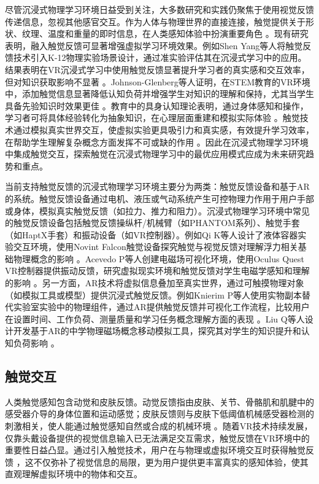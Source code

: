 \documentclass[runningheads]{llncs}
\begin{document}
尽管沉浸式物理学习环境日益受到关注，大多数研究和实践仍聚焦于使用视觉反馈传递信息，忽视其他感官交互。作为人体与物理世界的直接连接，触觉提供关于形状、纹理、温度和重量的即时信息，在人类感知体验中扮演重要角色 \cite{zhang2023active}。现有研究表明，融入触觉反馈可显著增强虚拟学习环境效果。例如Shen Yang等人将触觉反馈技术引入K-12物理实验场景设计，通过准实验评估其在沉浸式学习中的应用。结果表明在VR沉浸式学习中使用触觉反馈显著提升学习者的真实感和交互效率，但对知识获取影响不显著 \cite{shen2023research}。Johnson-Glenberg等人证明，在STEM教育的VR环境中，添加触觉信息显著降低认知负荷并增强学生对知识的理解和保持，尤其当学生具备先验知识时效果更佳 \cite{johnson2023embodied}。教育中的具身认知理论表明，通过身体感知和操作，学习者可将具体经验转化为抽象知识，在心理层面重建和模拟实际体验 \cite{varela2017embodied}。触觉技术通过模拟真实世界交互，使虚拟实验更具吸引力和真实感，有效提升学习效率，在帮助学生理解复杂概念方面发挥不可或缺的作用 \cite{shapiro2019embodied}。因此在沉浸式物理学习环境中集成触觉交互，探索触觉在沉浸式物理学习中的最优应用模式应成为未来研究趋势和重点。

当前支持触觉反馈的沉浸式物理学习环境主要分为两类：触觉反馈设备和基于AR的系统。触觉反馈设备通过电机、液压或气动系统产生可控物理力作用于用户手部或身体，模拟真实触觉反馈（如拉力、推力和阻力）。沉浸式物理学习环境中常见的触觉反馈设备包括触觉反馈操纵杆/机械臂（如PHANTOM系列）、触觉手套（如HaptX手套）和振动设备（如VR控制器）。例如Qi K等人设计了液体容器实验交互环境，使用Novint Falcon触觉设备探究触觉与视觉反馈对理解浮力相关基础物理概念的影响 \cite{qi2020impact}。Acevedo P等人创建电磁场可视化环境，使用Oculus Quest VR控制器提供振动反馈，研究虚拟现实环境和触觉反馈对学生电磁学感知和理解的影响 \cite{acevedo2022effects}。另一方面，AR技术将虚拟信息叠加至真实世界，通过可触摸物理对象（如模拟工具或模型）提供沉浸式触觉反馈。例如Knierim P等人使用实物副本替代实验室实验中的物理组件，通过AR提供触觉反馈并可视化工作流程，比较用户在设置时间、工作负荷、测量质量和学习任务概念理解方面的表现 \cite{knierim2020tangibility}。Liu Q等人设计开发基于AR的中学物理磁场概念移动模拟工具，探究其对学生的知识提升和认知负荷影响 \cite{liu2021effects}。

\subsection{触觉交互}
人类触觉感知包含动觉和皮肤反馈。动觉反馈指由皮肤、关节、骨骼肌和肌腱中的感受器介导的身体位置和运动感觉；皮肤反馈则与皮肤下低阈值机械感受器检测的刺激相关，使人能通过触觉感知自然或合成的机械环境 \cite{hayward2004haptic}。随着VR技术持续发展，仅靠头戴设备提供的视觉信息输入已无法满足交互需求，触觉反馈在VR环境中的重要性日益凸显。通过引入触觉技术，用户在与物理或虚拟环境交互时获得触觉反馈 \cite{sreelakshmi2017haptic}，这不仅弥补了视觉信息的局限，更为用户提供更丰富真实的感知体验，使其直观理解虚拟环境中的物体和交互。
\end{document}
